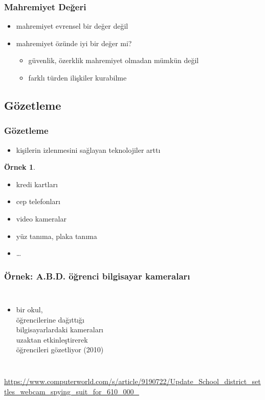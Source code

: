 \documentclass[dvipsnames]{beamer}
\theoremstyle{definition}
\theoremstyle{example}
\newtheorem{ornek}[theorem]{Örnek}
\theoremstyle{plain}
\begin{document}
\begin{frame}
  \frametitle{Mahremiyet Değeri}

  \begin{itemize}
    \item mahremiyet evrensel bir değer değil

    \pause
    \medskip
    \item mahremiyet özünde iyi bir değer mi?
    \begin{itemize}
      \item güvenlik, özerklik mahremiyet olmadan mümkün değil
      \item farklı türden ilişkiler kurabilme
    \end{itemize}
  \end{itemize}
\end{frame}

\subsection{Gözetleme}

\begin{frame}
  \frametitle{Gözetleme}

  \begin{itemize}
    \item kişilerin izlenmesini sağlayan teknolojiler arttı
  \end{itemize}

  \pause
  \begin{ornek}
    \begin{itemize}
      \item kredi kartları
      \item cep telefonları
      \item video kameralar
      \item yüz tanıma, plaka tanıma
      \item \ldots
    \end{itemize}
  \end{ornek}
\end{frame}

\begin{frame}
  \frametitle{Örnek: A.B.D. öğrenci bilgisayar kameraları}

  \begin{columns}

    \begin{itemize}
      \item bir okul,\\
        öğrencilerine dağıttığı\\
        bilgisayarlardaki kameraları\\
        uzaktan etkinleştirerek\\
        öğrencileri gözetliyor (2010)
    \end{itemize}
  \end{columns}

  \medskip
  \tiny{\url{https://www.computerworld.com/s/article/9190722/Update_School_district_settles_webcam_spying_suit_for_610_000_}}\\
\end{frame}
\end{document}
